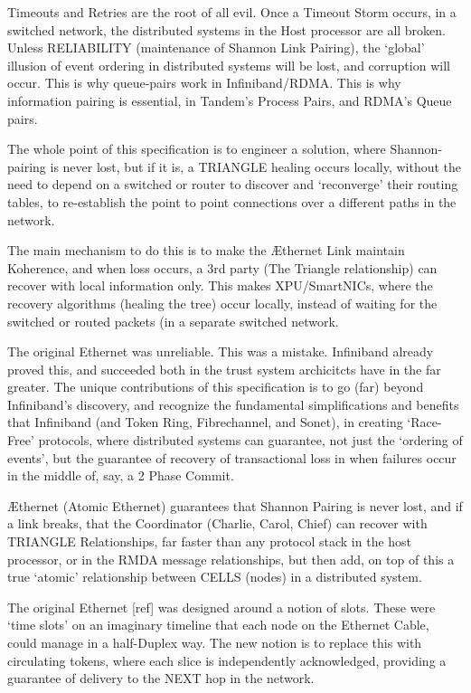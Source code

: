 \documentclass[../OAE-SPEC-MAIN.tex]{subfiles}
\begin{document}
Timeouts and Retries are the root of all evil.  Once a Timeout Storm occurs, in a switched network, the distributed systems in the Host processor are all broken. Unless RELIABILITY (maintenance of Shannon Link Pairing),  the `global' illusion of event ordering in distributed systems will be lost, and corruption will occur.  This is why queue-pairs work in Infiniband/RDMA. This is why information pairing is essential, in Tandem's Process Pairs, and RDMA's Queue pairs.

The whole point of this specification is to engineer a solution, where Shannon-pairing is never lost, but if it is, a TRIANGLE healing occurs locally, without the need to depend on a switched or router to discover and  `reconverge' their routing tables, to re-establish the point to point connections over a different paths in the network.  

The main mechanism to do this is to make the Æthernet Link maintain Koherence, and when loss occurs, a 3rd party (The Triangle relationship) can recover with local information only. This makes XPU/SmartNICs, where the recovery algorithms (healing the tree) occur locally, instead of waiting for the switched or routed packets (in a separate switched network.

The original Ethernet was unreliable. This was a mistake. Infiniband already proved this, and succeeded both in the trust system archicitcts have in the far greater. The unique contributions of this specification is to go (far) beyond Infiniband's discovery, and recognize the fundamental simplifications and benefits that Infiniband (and Token Ring,  Fibrechannel, and Sonet), in creating `Race-Free' protocols, where distributed systems can guarantee, not just the `ordering of events', but the guarantee of recovery of transactional loss in when failures occur in the middle of, say, a 2 Phase Commit. 

Æthernet (Atomic Ethernet) guarantees that Shannon Pairing is never lost, and if a link breaks, that the Coordinator (Charlie, Carol, Chief) can recover with TRIANGLE Relationships, far faster than any protocol stack in the host processor, or in the RMDA message relationships, but then add, on top of this a true `atomic' relationship between CELLS (nodes) in a distributed system.

The original Ethernet [ref] was designed around a notion of slots. These were `time slots' on an imaginary timeline that each node on the Ethernet Cable, could manage in a half-Duplex way.  The new notion is to replace this with circulating tokens, where each slice is independently acknowledged, providing a guarantee of delivery to the NEXT hop in the network.
\end{document}
